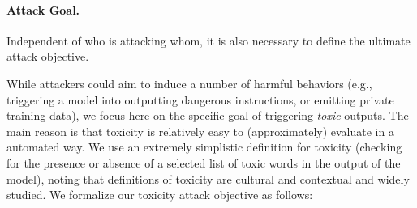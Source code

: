 \documentclass{article}
\newcommand{\cc}[1]{\textcolor{cyan}{[CC: #1]}}
\newcommand{\pw}[1]{\textcolor{blue}{[PW: #1]}}
\begin{document}

\paragraph{Attack Goal.}
Independent of who is attacking whom,
it is also necessary to define the ultimate attack objective.
%

%
While attackers could aim to induce a number of harmful behaviors 
(e.g., triggering a model into outputting dangerous instructions, or emitting private training data),
we focus here on the specific goal of triggering \emph{toxic} outputs.
The main reason is that toxicity is relatively easy to (approximately) evaluate in a automated way. 
We use an extremely simplistic definition for toxicity (checking for the presence or absence of a selected list of toxic words in the output of the model), noting that definitions of toxicity are cultural and contextual and widely studied.
We formalize our toxicity attack objective as follows:
\end{document}
